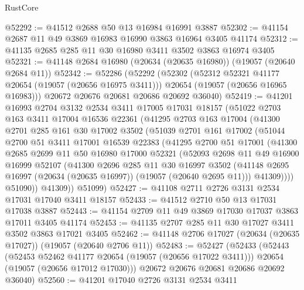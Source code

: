 \begin{lexlean}{RustCore}
\begin{coremodule}
@52292 := @41512 @2688 @50 @13 @16984 @16991 @3887
@52302 := @41154 @2687 @11 @49 @3869 @16983 @16990 @3863 @16964 @3405 @41174
@52312 := @41135 @2685 @285 @11 @30 @16980 @3411 @3502 @3863 @16974 @3405
@52321 := @41148 @2684 @16980 (@20634 (@20635 @16980)) (@19057 (@20640 @2684 @11))
@52342 := @52286
    (@52292
      (@52302
        (@52312 @52321 @41177 @20654 (@19057 (@20656 @16975 @3411)))
        @20654
        (@19057 (@20656 @16965 @16983)))
      @20672
      @20676
      @20681
      @20686
      @20692
      @36040)
@52419 := @41201
    @16993
    @2704
    @3132
    @2534
    @3411
    @17005
    @17031
    @18157
    (@51022
      @2703
      @163
      @3411
      @17004
      @16536
      @22361
      (@41295
        @2703
        @163
        @17004
        (@41300
          @2701
          @285
          @161
          @30
          @17002
          @3502
          (@51039
            @2701
            @161
            @17002
            (@51044
              @2700
              @51
              @3411
              @17001
              @16539
              @22383
              (@41295
                @2700
                @51
                @17001
                (@41300
                  @2685
                  @2699
                  @11
                  @50
                  @16980
                  @17000
                  @52321
                  (@52093
                    @2698
                    @11
                    @49
                    @16900
                    @16999
                    @52107
                    (@41300
                      @2696
                      @285
                      @11
                      @30
                      @16997
                      @3502
                      (@41148 @2695 @16997 (@20634 (@20635 @16997)) (@19057 (@20640 @2695 @11)))
                      @41309))))
              @51090))
          @41309))
      @51099)
@52427 := @41108 @2711 @2726 @3131 @2534 @17031 @17040 @3411 @18157
@52433 := @41512 @2710 @50 @13 @17031 @17038 @3887
@52443 := @41154 @2709 @11 @49 @3869 @17030 @17037 @3863 @17011 @3405 @41174
@52453 := @41135 @2707 @285 @11 @30 @17027 @3411 @3502 @3863 @17021 @3405
@52462 := @41148 @2706 @17027 (@20634 (@20635 @17027)) (@19057 (@20640 @2706 @11))
@52483 := @52427
    (@52433
      (@52443
        (@52453 @52462 @41177 @20654 (@19057 (@20656 @17022 @3411)))
        @20654
        (@19057 (@20656 @17012 @17030)))
      @20672
      @20676
      @20681
      @20686
      @20692
      @36040)
@52560 := @41201
    @17040
    @2726
    @3131
    @2534
    @3411

\end{coremodule}
\end{lexlean}
